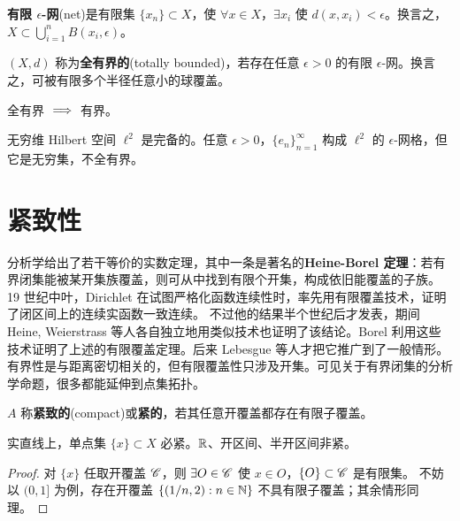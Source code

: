 
\begin{definition}
    \textbf{有限 $\epsilon$-网}(net)是有限集 $\{x_n\}\subset X$，使 $\forall x\in X$，$\exists x_i$ 使 $d(x,x_i)<\epsilon$。换言之，$X\subset\bigcup_{i=1}^n B(x_i,\epsilon)$。
\end{definition}

\begin{definition}
    $(X,d)$ 称为\textbf{全有界的}(totally bounded)，若存在任意 $\epsilon>0$ 的有限 $\epsilon$-网。换言之，可被有限多个半径任意小的球覆盖。
\end{definition}

\begin{remark}
    全有界 $\implies$ 有界。
\end{remark}

\begin{example}
    无穷维 Hilbert 空间 $\ell^2$ 是完备的。任意 $\epsilon>0$，$\{e_n\}_{n=1}^\infty$ 构成 $\ell^2$ 的 $\epsilon$-网格，但它是无穷集，不全有界。
\end{example}


\section{紧致性}

分析学给出了若干等价的实数定理，其中一条是著名的\textbf{Heine-Borel 定理}：若有界闭集能被某开集族覆盖，则可从中找到有限个开集，构成依旧能覆盖的子族。
19 世纪中叶，Dirichlet 在试图严格化函数连续性时，率先用有限覆盖技术，证明了闭区间上的连续实函数一致连续。
不过他的结果半个世纪后才发表，期间 Heine, Weierstrass 等人各自独立地用类似技术也证明了该结论。Borel 利用这些技术证明了上述的有限覆盖定理。后来 Lebesgue 等人才把它推广到了一般情形。
有界性是与距离密切相关的，但有限覆盖性只涉及开集。可见关于有界闭集的分析学命题，很多都能延伸到点集拓扑。

\begin{definition}
    $A$ 称\textbf{紧致的}(compact)或\textbf{紧的}，若其任意开覆盖都存在有限子覆盖。
\end{definition}

\begin{example}
    实直线上，单点集 $\{x\}\subset X$ 必紧。$\mathbb{R}$、开区间、半开区间非紧。
\end{example}
\begin{proof}
    对 $\{x\}$ 任取开覆盖 $\mathscr C$，则 $\exists O\in\mathscr C$ 使 $x\in O$，$\{O\}\subset\mathscr C$ 是有限集。
    不妨以 $(0,1]$ 为例，存在开覆盖 $\{(1/n,2):n\in\mathbb{N}\}$ 不具有限子覆盖；其余情形同理。
\end{proof}

